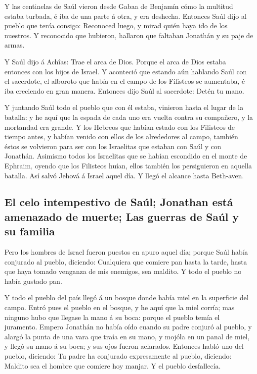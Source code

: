  Y las centinelas de Saúl vieron desde Gabaa de Benjamín
cómo la multitud estaba turbada, é iba de una parte á otra, y era
deshecha.  Entonces Saúl dijo al pueblo que tenía
consigo: Reconoced luego, y mirad quién haya ido de los nuestros. Y
reconocido que hubieron, hallaron que faltaban Jonathán y su paje de
armas.

 Y Saúl dijo á Achîas: Trae el arca de Dios. Porque el
arca de Dios estaba entonces con los hijos de Israel.  Y
aconteció que estando aún hablando Saúl con el sacerdote, el alboroto
que había en el campo de los Filisteos se aumentaba, é iba creciendo en
gran manera. Entonces dijo Saúl al sacerdote: Detén tu mano.

 Y juntando Saúl todo el pueblo que con él estaba,
vinieron hasta el lugar de la batalla: y he aquí que la espada de cada
uno era vuelta contra su compañero, y la mortandad era grande.
 Y los Hebreos que habían estado con los Filisteos de
tiempo antes, y habían venido con ellos de los alrededores al campo,
también éstos se volvieron para ser con los Israelitas que estaban con
Saúl y con Jonathán.  Asimismo todos los Israelitas que
se habían escondido en el monte de Ephraim, oyendo que los Filisteos
huían, ellos también los persiguieron en aquella batalla.
 Así salvó Jehová á Israel aquel día. Y llegó el alcance
hasta Beth-aven.

\hypertarget{el-celo-intempestivo-de-sauxfal-jonathan-estuxe1-amenazado-de-muerte-las-guerras-de-sauxfal-y-su-familia}{%
\subsection{El celo intempestivo de Saúl; Jonathan está amenazado de
muerte; Las guerras de Saúl y su
familia}\label{el-celo-intempestivo-de-sauxfal-jonathan-estuxe1-amenazado-de-muerte-las-guerras-de-sauxfal-y-su-familia}}

 Pero los hombres de Israel fueron puestos en apuro aquel
día; porque Saúl había conjurado al pueblo, diciendo: Cualquiera que
comiere pan hasta la tarde, hasta que haya tomado venganza de mis
enemigos, sea maldito. Y todo el pueblo no había gustado pan.

 Y todo el pueblo del país llegó á un bosque donde había
miel en la superficie del campo.  Entró pues el pueblo en
el bosque, y he aquí que la miel corría; mas ninguno hubo que llegase la
mano á su boca: porque el pueblo temía el juramento. 
Empero Jonathán no había oído cuando su padre conjuró al pueblo, y
alargó la punta de una vara que traía en su mano, y mojóla en un panal
de miel, y llegó su mano á su boca; y sus ojos fueron aclarados.
 Entonces habló uno del pueblo, diciendo: Tu padre ha
conjurado expresamente al pueblo, diciendo: Maldito sea el hombre que
comiere hoy manjar. Y el pueblo desfallecía.

